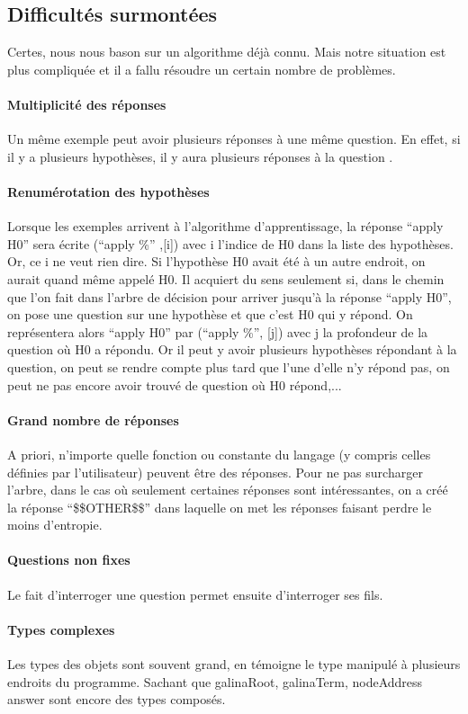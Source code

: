 \subsection*{Difficultés surmontées}
Certes, nous nous bason sur un algorithme déjà connu. Mais notre situation est plus compliquée et il a fallu résoudre un certain nombre de problèmes.

\paragraph{Multiplicité des réponses} Un même exemple peut avoir plusieurs réponses à une même question. En effet, si il y a plusieurs hypothèses, il y aura plusieurs réponses à la question .
\paragraph{Renumérotation des hypothèses} Lorsque les exemples arrivent à l'algorithme d'apprentissage, la réponse ``apply H0'' sera écrite (``apply \%'' ,[i]) avec i l'indice de H0 dans la liste des hypothèses. Or, ce i ne veut rien dire. Si l'hypothèse H0 avait été à un autre endroit, on aurait quand même appelé H0. Il acquiert du sens seulement si, dans le chemin que l'on fait dans l'arbre de décision pour arriver jusqu'à la réponse ``apply H0'', on pose une question sur une hypothèse et que c'est H0 qui y répond. On représentera alors ``apply H0'' par (``apply \%'', [j]) avec j la profondeur de la question où H0 a répondu. Or il peut y avoir plusieurs hypothèses répondant à la question, on peut se rendre compte plus tard que l'une d'elle n'y répond pas, on peut ne pas encore avoir trouvé de question où H0 répond,...
\paragraph{Grand nombre de réponses} A priori, n'importe quelle fonction ou constante du langage (y compris celles définies par l'utilisateur) peuvent être des réponses. Pour ne pas surcharger l'arbre, dans le cas où seulement certaines réponses sont intéressantes, on a créé la réponse ``\$\$OTHER\$\$'' dans laquelle on met les réponses faisant perdre le moins d'entropie.
\paragraph{Questions non fixes} Le fait d'interroger une question permet ensuite d'interroger ses fils.
\paragraph{Types complexes} Les types des objets sont souvent grand, en témoigne le type 
  manipulé à plusieurs endroits du programme. Sachant que galinaRoot, galinaTerm, nodeAddress answer sont encore des types composés.
